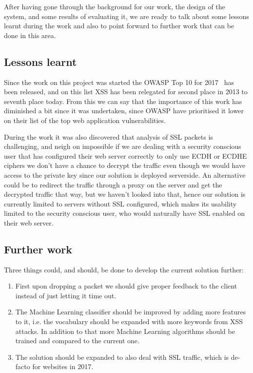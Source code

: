 \documentclass[10pt,journal,compsoc]{IEEEtran}
\begin{document}
After having gone through the background for our work, the design of the system, and some results of evaluating it,
we are ready to talk about some lessons learnt during the work and also to point forward to further work that can be
done in this area.

\subsection{Lessons learnt}

Since the work on this project was started the OWASP Top 10 for 2017~\citep*{owasp2017} has been released, and on this
list XSS has been relegated for second place in 2013 to seventh place today. From this we can say that the importance of
this work has diminished a bit since it was undertaken, since OWASP have prioritised it lower on their list of the
top web application vulnerabilities.

During the work it was also discovered that analysis of SSL packets is challenging, and neigh on impossible if we are
dealing with a security conscious user that has configured their web server correctly to only use ECDH or ECDHE ciphers
we don't have a chance to decrypt the traffic even though we would have access to the private key since our solution
is deployed serverside. An alternative could be to redirect the traffic through a proxy on the server and get the
decrypted traffic that way, but we haven't looked into that, hence our solution is currently limited to servers without
SSL configured, which makes its usability limited to the security conscious user, who would naturally have SSL enabled
on their web server.

\subsection{Further work}

Three things could, and should, be done to develop the current solution further:
\begin{enumerate}
\item First upon dropping a packet we should give proper feedback to the client instead of just letting it time out.
\item The Machine Learning classifier should be improved by adding more features to it, i.e. the vocabulary should be
expanded with more keywords from XSS attacks. In addition to that more Machine Learning algorithms should be trained and
compared to the current one.
\item The solution should be expanded to also deal with SSL traffic, which is de-facto for websites in 2017.
\end{enumerate}
\end{document}
